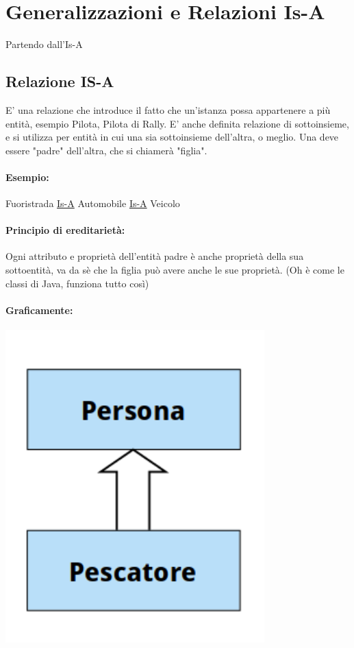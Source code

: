 \documentclass[12pt, a4paper, openany, twoside]{book}
\begin{document}
\section{Generalizzazioni e Relazioni Is-A}
Partendo dall'Is-A
\subsection{Relazione IS-A}
E' una relazione che introduce il fatto che un'istanza possa appartenere a più
entità, esempio Pilota, Pilota di Rally. E' anche definita relazione di sottoinsieme,
e si utilizza per entità in cui una sia sottoinsieme dell'altra, o meglio. Una 
deve essere "padre" dell'altra, che si chiamerà "figlia".
\paragraph{Esempio:} Fuoristrada \underline{Is-A} Automobile \underline{Is-A} Veicolo
\paragraph{Principio di ereditarietà:} Ogni attributo e proprietà dell'entità
padre è anche proprietà della sua sottoentità, va da sè che la figlia può avere
anche le sue proprietà. (Oh è come le classi di Java, funziona tutto così)
\paragraph{Graficamente:}
\begin{center}
\includegraphics[width=0.75\textwidth]{4.png}
\end{center}
\end{document}
